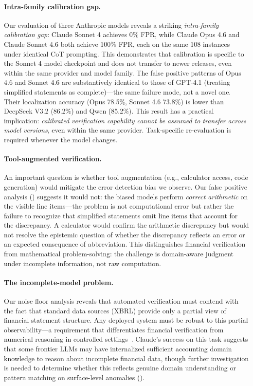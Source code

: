 \documentclass[11pt]{article}
\begin{document}
\paragraph{Intra-family calibration gap.}
Our evaluation of three Anthropic models reveals a striking \emph{intra-family calibration gap}: Claude Sonnet 4 achieves 0\% FPR, while Claude Opus 4.6 and Claude Sonnet 4.6 both achieve 100\% FPR, each on the same 108 instances under identical CoT prompting.
This demonstrates that calibration is specific to the Sonnet 4 model checkpoint and does not transfer to newer releases, even within the same provider and model family.
The false positive patterns of Opus 4.6 and Sonnet 4.6 are substantively identical to those of GPT-4.1 (treating simplified statements as complete)---the same failure mode, not a novel one.
Their localization accuracy (Opus 78.5\%, Sonnet 4.6 73.8\%) is lower than DeepSeek V3.2 (86.2\%) and Qwen (85.2\%).
This result has a practical implication: \emph{calibrated verification capability cannot be assumed to transfer across model versions}, even within the same provider.
Task-specific re-evaluation is required whenever the model changes.

\paragraph{Tool-augmented verification.}
An important question is whether tool augmentation (e.g., calculator access, code generation) would mitigate the error detection bias we observe.
Our false positive analysis () suggests it would not: the biased models perform \emph{correct arithmetic} on the visible line items---the problem is not computational error but rather the failure to recognize that simplified statements omit line items that account for the discrepancy.
A calculator would confirm the arithmetic discrepancy but would not resolve the epistemic question of whether the discrepancy reflects an error or an expected consequence of abbreviation.
This distinguishes financial verification from mathematical problem-solving: the challenge is domain-aware judgment under incomplete information, not raw computation.

\paragraph{The incomplete-model problem.}
Our noise floor analysis reveals that automated verification must contend with the fact that standard data sources (XBRL) provide only a partial view of financial statement structure.
Any deployed system must be robust to this partial observability---a requirement that differentiates financial verification from numerical reasoning in controlled settings~\citep{tang2025financereasoning}.
Claude's success on this task suggests that some frontier LLMs may have internalized sufficient accounting domain knowledge to reason about incomplete financial data, though further investigation is needed to determine whether this reflects genuine domain understanding or pattern matching on surface-level anomalies ().
\end{document}
